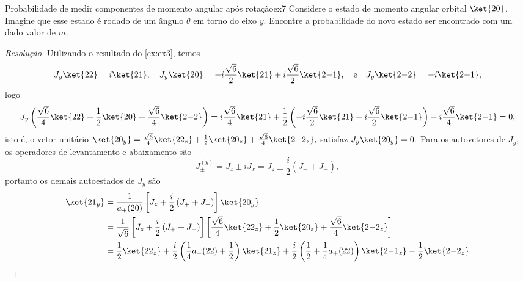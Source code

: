 \begin{exercício}{Probabilidade de medir componentes de momento angular após rotação}{ex7}
    Considere o estado de momento angular orbital \(\ket{2 0}\). Imagine que esse estado é rodado de um ângulo \(\theta\) em torno do eixo \(y\). Encontre a probabilidade do novo estado ser encontrado com um dado valor de \(m\).
\end{exercício}
\begin{proof}[Resolução]
    Utilizando o resultado do \cref{ex:ex3}, temos
    \begin{equation*}
        J_y \ket{22} = i \ket{21},\quad
        J_y \ket{20} = -i\frac{\sqrt{6}}{2} \ket{21} + i \frac{\sqrt{6}}{2} \ket{2{-1}},\quad\text{e}\quad
        J_y \ket{2{-2}} = -i \ket{2{-1}},
    \end{equation*}
    logo
    \begin{equation*}
        J_y \left(\frac{\sqrt{6}}{4}\ket{22} + \frac12 \ket{20} + \frac{\sqrt{6}}{4} \ket{2{-2}}\right) 
        = i\frac{\sqrt{6}}{4} \ket{21} + \frac12 \left(-i \frac{\sqrt{6}}{2} \ket{21} + i \frac{\sqrt{6}}{2} \ket{2 {-1}}\right) - i\frac{\sqrt{6}}{4}\ket{2{-1}}
        = 0,
    \end{equation*}
    isto é, o vetor unitário \(\ket{20_y} = \frac{\sqrt{6}}{4}\ket{22_z} + \frac12 \ket{20_z} + \frac{\sqrt{6}}{4} \ket{2{-2}_z},\) satisfaz \(J_y \ket{20_y} = 0.\) Para os autovetores de \(J_y,\) os operadores de levantamento e abaixamento são 
    \begin{equation*}
        J^{(y)}_{\pm} = J_z \pm i J_x = J_z \pm \frac{i}{2} \left(J_+ + J_-\right),
    \end{equation*}
    portanto os demais autoestados de \(J_y\) são
    \begin{align*}
        \ket{21_y} &= \frac{1}{a_+(20)}\left[J_z + \frac{i}{2} \left(J_+ + J_-\right)\right]\ket{20_y}\\
                   &= \frac{1}{\sqrt{6}}\left[J_z + \frac{i}{2} \left(J_+ + J_-\right)\right]\left[\frac{\sqrt{6}}{4}\ket{22_z} + \frac12 \ket{20_z} + \frac{\sqrt{6}}{4} \ket{2{-2}_z}\right]\\
                   &= \frac{1}{2}\ket{22_z} + \frac{i}{2}\left(\frac{1}{4} a_-(22) + \frac12 \right)\ket{21_z} + \frac{i}{2}\left(\frac12 + \frac{1}{4} a_+(22)\right)\ket{2{-1}_z} - \frac{1}{2}\ket{2{-2}_z}\\

\end{align*}
\end{proof}
